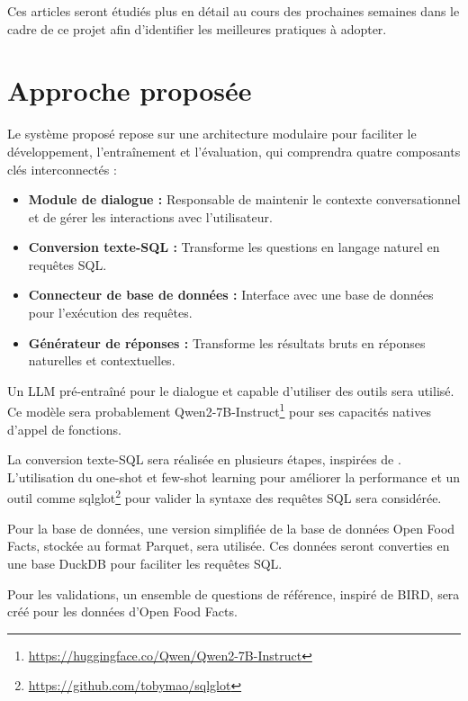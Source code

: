 \documentclass[a4paper,11pt]{article}
\begin{document}
Ces articles seront étudiés plus en détail au cours des prochaines semaines dans le cadre de ce projet afin d'identifier les meilleures pratiques à adopter.




\section{Approche proposée}
\label{sec:approche}


Le système proposé repose sur une architecture modulaire pour faciliter le développement, l'entraînement et l'évaluation, qui 
comprendra quatre composants clés interconnectés :

\begin{itemize}
    \item \textbf{Module de dialogue :} Responsable de maintenir le contexte conversationnel et de gérer les interactions avec l'utilisateur. 
    \item \textbf{Conversion texte-SQL :} Transforme les questions en langage naturel en requêtes SQL. 
    \item \textbf{Connecteur de base de données :} Interface avec une base de données pour l'exécution des requêtes.
    \item \textbf{Générateur de réponses :} Transforme les résultats bruts en réponses naturelles et contextuelles.
\end{itemize}

Un LLM pré-entraîné pour le dialogue et capable d'utiliser des outils sera utilisé. 
Ce modèle sera probablement Qwen2-7B-Instruct\footnote{\url{https://huggingface.co/Qwen/Qwen2-7B-Instruct}} pour ses capacités natives d'appel de fonctions.

La conversion texte-SQL sera réalisée en plusieurs étapes, inspirées de \citet{biswal2024text2sql}. 
L'utilisation du one-shot et few-shot learning pour améliorer la performance et un outil comme sqlglot\footnote{\url{https://github.com/tobymao/sqlglot}} 
pour valider la syntaxe des requêtes SQL sera considérée.

Pour la base de données, une version simplifiée de la base de données Open Food Facts, stockée au format Parquet, sera utilisée.
Ces données seront converties en une base DuckDB pour faciliter les requêtes SQL.

Pour les validations, un ensemble de questions de référence, inspiré de BIRD, sera créé pour les données d'Open Food Facts.
\end{document}

